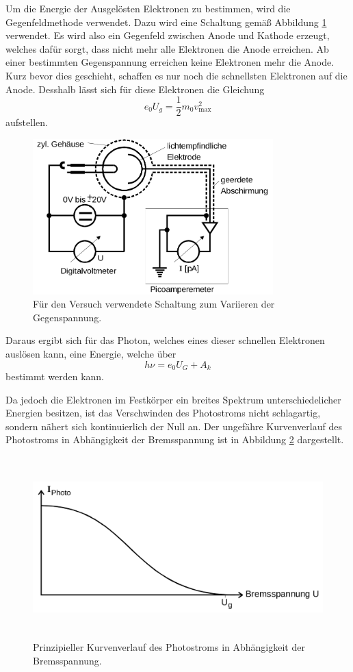 Um die Energie der Ausgelösten Elektronen zu bestimmen, wird die Gegenfeldmethode verwendet. Dazu wird eine Schaltung gemäß Abbildung \ref{fig:Schaltung} verwendet. Es wird also ein Gegenfeld zwischen Anode und Kathode erzeugt, welches dafür sorgt, dass nicht mehr alle Elektronen die Anode erreichen. Ab einer bestimmten Gegenspannung erreichen keine Elektronen mehr die Anode. Kurz bevor dies geschieht, schaffen es nur noch die schnellsten Elektronen auf die Anode. Desshalb lässt sich für diese Elektronen die Gleichung
\begin{equation}
    e_0 U_g=\frac{1}{2}m_0v_{\text{max}}^2
\end{equation}
aufstellen.

\begin{figure}
\centering
\includegraphics[height=6cm]{data/Schaltung.png}
\caption{Für den Versuch verwendete Schaltung zum Variieren der Gegenspannung.}
\label{fig:Schaltung}
\end{figure}

Daraus ergibt sich für das Photon, welches eines dieser schnellen Elektronen auslösen kann, eine Energie, welche über 
\begin{equation}
    h\nu=e_0 U_G + A_k
\end{equation}
bestimmt werden kann. 

Da jedoch die Elektronen im Festkörper ein breites Spektrum unterschiedelicher Energien besitzen, ist das Verschwinden des Photostroms nicht schlagartig, sondern nähert sich kontinuierlich der Null an. Der ungefähre Kurvenverlauf des Photostroms in Abhängigkeit der Bremsspannung ist in Abbildung \ref{fig:Kurve} dargestellt.

\begin{figure}
\centering
\includegraphics[height=7cm]{data/Kurve.png}
\caption{Prinzipieller Kurvenverlauf des Photostroms in Abhängigkeit der Bremsspannung.}
\label{fig:Kurve}
\end{figure}

